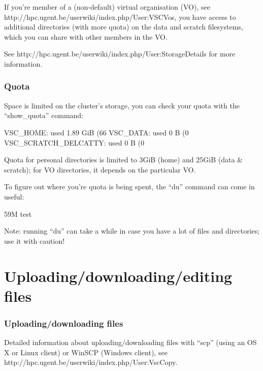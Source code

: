 If you're member of a (non-default) virtual organisation (VO), see http://hpc.ugent.be/userwiki/index.php/User:VSCVos, you have access to additional directories (with more quota) on the data and scratch filesystems, which you can share with other members in the VO.

See http://hpc.ugent.be/userwiki/index.php/User:StorageDetails for more information.

\subsection{Quota}

Space is limited on the cluster's storage, you can check your quota with the
``show\_quota'' command:

\begin{prompt}
VSC\_HOME: used 1.89 GiB (66%
VSC\_DATA: used 0 B (0%
VSC\_SCRATCH\_DELCATTY: used 0 B (0%
\end{prompt}

Quota for personal directories is limited to 3GiB (home) and 25GiB (data & scratch); for VO directories, it depends on the particular VO.

To figure out where you're quota is being spent, the ``du'' command can come in useful:

\begin{prompt}
59M   test
\end{prompt}

Note: running ``du'' can take a while in case you have a lot of files and directories; use it with caution!


\chapter{Uploading/downloading/editing files}

\subsection{Uploading/downloading files}

Detailed information about uploading/downloading files with ``scp'' (using an OS X or Linux client) or WinSCP (Windows client), see http://hpc.ugent.be/userwiki/index.php/User:VscCopy.

